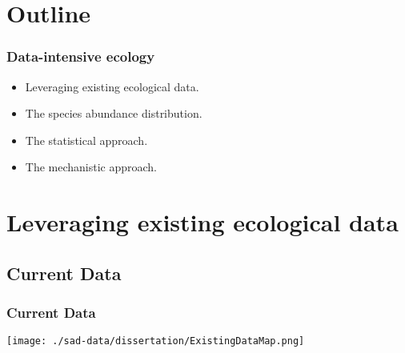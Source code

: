 \documentclass[14pt]{beamer}
\begin{document}

\section{Outline}
\begin{frame}
\frametitle{Data-intensive ecology}
\begin{itemize}
\item Leveraging existing ecological data.
\item The species abundance distribution.
\item The statistical approach.
\item The mechanistic approach.
\end{itemize}
\end{frame}


\section{Leveraging existing ecological data}
\subsection{Current Data}
\begin{frame}[t]
\frametitle{Current Data}
\vspace{-7pt}
\begin{center}
\texttt{[image: ./sad-data/dissertation/ExistingDataMap.png]}
\end{center}
\end{frame}
\end{document}
